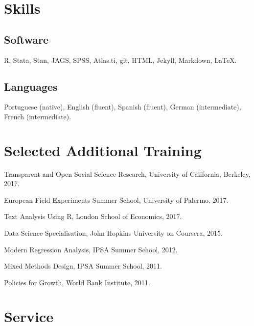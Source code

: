 \documentclass[a4paper]{article}
\renewenvironment{itemize}{
	\begin{list}{}{
			\setlength{\leftmargin}{1.5em}
		}
		}{
	\end{list}
}
\begin{document}
	\section*{Skills}

	\subsection*{Software}

	\begin{itemize}
		\item R, Stata, Stan, JAGS, SPSS, Atlas.ti, git, HTML, Jekyll, Markdown, \LaTeX{}.
	\end{itemize}

	\subsection*{Languages}

	\begin{itemize}
		\item Portuguese (native), English (fluent), Spanish (fluent), German (intermediate), French (intermediate).
	\end{itemize}

	\section*{Selected Additional Training}

	\begin{itemize}
		\item Transparent and Open Social Science Research, University of California, Berkeley, 2017. %
		\item European Field Experiments Summer School, University of Palermo, 2017.
		\item Text Analysis Using R, London School of Economics, 2017.
		\item Data Science Specialisation, John Hopkins University on Coursera, 2015.
		\item Modern Regression Analysis, IPSA Summer School, 2012.
		\item Mixed Methods Design, IPSA Summer School, 2011.
		\item Policies for Growth, World Bank Institute, 2011.
	\end{itemize}

	\section*{Service}
\end{document}
